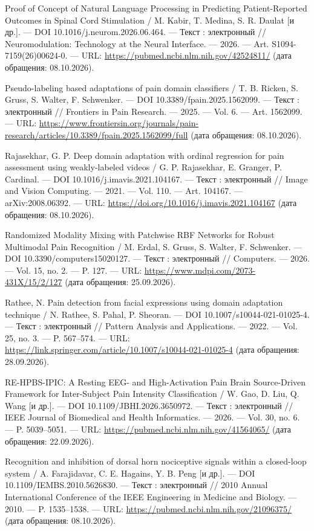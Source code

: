 \begin{list}{}{\setlength{\leftmargin}{10mm}\setlength{\labelwidth}{8mm}\setlength{\labelsep}{2mm}\setlength{\itemsep}{0pt}\setlength{\parsep}{0pt}\setlength{\topsep}{0pt}}
\item[234.] Proof of Concept of Natural Language Processing in Predicting Patient-Reported Outcomes in Spinal Cord Stimulation / M. Kabir, T. Medina, S. R. Daulat [и др.]. — DOI 10.1016/j.neurom.2026.06.464. — Текст : электронный // Neuromodulation: Technology at the Neural Interface. — 2026. — Art. S1094-7159(26)00624-0. — URL: \url{https://pubmed.ncbi.nlm.nih.gov/42524811/} (дата обращения: 08.10.2026).
\item[235.] Pseudo-labeling based adaptations of pain domain classifiers / T. B. Ricken, S. Gruss, S. Walter, F. Schwenker. — DOI 10.3389/fpain.2025.1562099. — Текст : электронный // Frontiers in Pain Research. — 2025. — Vol. 6. — Art. 1562099. — URL: \url{https://www.frontiersin.org/journals/pain-research/articles/10.3389/fpain.2025.1562099/full} (дата обращения: 08.10.2026).
\item[236.] Rajasekhar, G. P. Deep domain adaptation with ordinal regression for pain assessment using weakly-labeled videos / G. P. Rajasekhar, E. Granger, P. Cardinal. — DOI 10.1016/j.imavis.2021.104167. — Текст : электронный // Image and Vision Computing. — 2021. — Vol. 110. — Art. 104167. — arXiv:2008.06392. — URL: \url{https://doi.org/10.1016/j.imavis.2021.104167} (дата обращения: 08.10.2026).
\item[237.] Randomized Modality Mixing with Patchwise RBF Networks for Robust Multimodal Pain Recognition / M. Erdal, S. Gruss, S. Walter, F. Schwenker. — DOI 10.3390/computers15020127. — Текст : электронный // Computers. — 2026. — Vol. 15, no. 2. — P. 127. — URL: \url{https://www.mdpi.com/2073-431X/15/2/127} (дата обращения: 25.09.2026).
\item[238.] Rathee, N. Pain detection from facial expressions using domain adaptation technique / N. Rathee, S. Pahal, P. Sheoran. — DOI 10.1007/s10044-021-01025-4. — Текст : электронный // Pattern Analysis and Applications. — 2022. — Vol. 25, no. 3. — P. 567–574. — URL: \url{https://link.springer.com/article/10.1007/s10044-021-01025-4} (дата обращения: 28.09.2026).
\item[239.] RE-HPBS-IPIC: A Resting EEG- and High-Activation Pain Brain Source-Driven Framework for Inter-Subject Pain Intensity Classification / W. Gao, D. Liu, Q. Wang [и др.]. — DOI 10.1109/JBHI.2026.3650972. — Текст : электронный // IEEE Journal of Biomedical and Health Informatics. — 2026. — Vol. 30, no. 6. — P. 5039–5051. — URL: \url{https://pubmed.ncbi.nlm.nih.gov/41564065/} (дата обращения: 22.09.2026).
\item[240.] Recognition and inhibition of dorsal horn nociceptive signals within a closed-loop system / A. Farajidavar, C. E. Hagains, Y. B. Peng [и др.]. — DOI 10.1109/IEMBS.2010.5626830. — Текст : электронный // 2010 Annual International Conference of the IEEE Engineering in Medicine and Biology. — 2010. — P. 1535–1538. — URL: \url{https://pubmed.ncbi.nlm.nih.gov/21096375/} (дата обращения: 08.10.2026).

\end{list}
